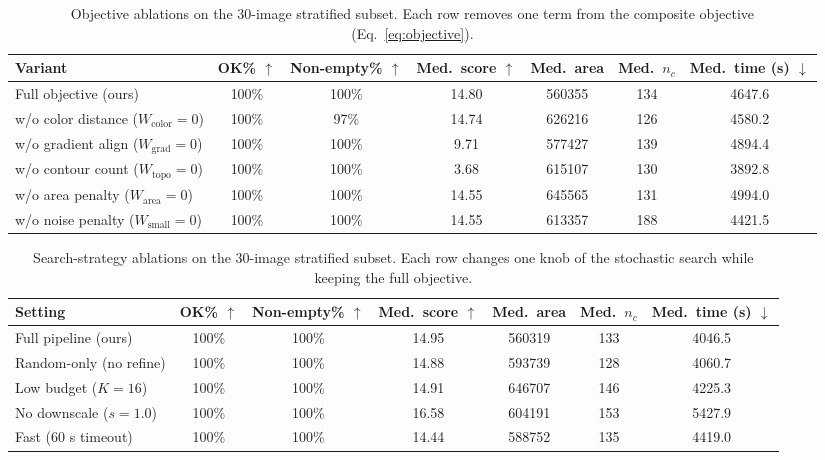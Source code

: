 \documentclass[journal]{IEEEtran}
\begin{document}
\begin{table}[t]
\centering
\caption{Objective ablations on the 30-image stratified subset. Each row removes one term from the composite objective (Eq.~\ref{eq:objective}).}
\label{tab:abl_obj}
\begin{tabular}{lcccccc}
\toprule
Variant & OK\% $\uparrow$ & Non-empty\% $\uparrow$ & Med.\ score $\uparrow$ & Med.\ area & Med.\ $n_c$ & Med.\ time (s) $\downarrow$ \\
\midrule
Full objective (ours) & 100\% & 100\% & 14.80 & 560355 & 134 & 4647.6 \\
w/o color distance ($W_{\mathrm{color}}{=}0$) & 100\% & 97\% & 14.74 & 626216 & 126 & 4580.2 \\
w/o gradient align ($W_{\mathrm{grad}}{=}0$) & 100\% & 100\% & 9.71 & 577427 & 139 & 4894.4 \\
w/o contour count ($W_{\text{topo}}{=}0$) & 100\% & 100\% & 3.68 & 615107 & 130 & 3892.8 \\
w/o area penalty ($W_{\text{area}}{=}0$) & 100\% & 100\% & 14.55 & 645565 & 131 & 4994.0 \\
w/o noise penalty ($W_{\text{small}}{=}0$) & 100\% & 100\% & 14.55 & 613357 & 188 & 4421.5 \\
\bottomrule
\end{tabular}
\end{table}

\begin{table}[t]
\centering
\caption{Search-strategy ablations on the 30-image stratified subset. Each row changes one knob of the stochastic search while keeping the full objective.}
\label{tab:abl_search}
\begin{tabular}{lcccccc}
\toprule
Setting & OK\% $\uparrow$ & Non-empty\% $\uparrow$ & Med.\ score $\uparrow$ & Med.\ area & Med.\ $n_c$ & Med.\ time (s) $\downarrow$ \\
\midrule
Full pipeline (ours) & 100\% & 100\% & 14.95 & 560319 & 133 & 4046.5 \\
Random-only (no refine) & 100\% & 100\% & 14.88 & 593739 & 128 & 4060.7 \\
Low budget ($K{=}16$) & 100\% & 100\% & 14.91 & 646707 & 146 & 4225.3 \\
No downscale ($s{=}1.0$) & 100\% & 100\% & 16.58 & 604191 & 153 & 5427.9 \\
Fast (60 s timeout) & 100\% & 100\% & 14.44 & 588752 & 135 & 4419.0 \\
\bottomrule
\end{tabular}
\end{table}
\end{document}
